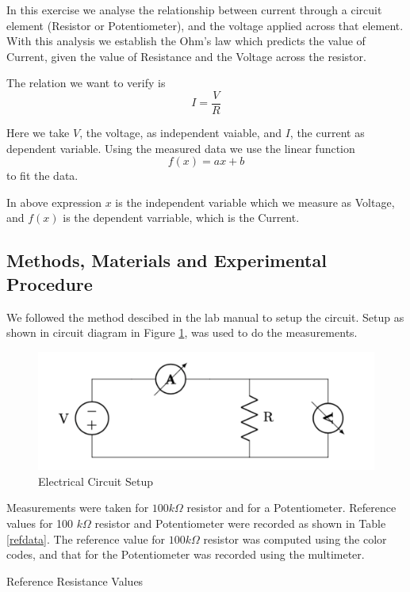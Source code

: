 \documentclass[letterpaper,12pt]{article}
\begin{document}
In this exercise we analyse the relationship between current through a circuit element (Resistor or Potentiometer), and the voltage applied across that element. 
With this analysis we establish the Ohm's law which predicts the value of Current, given the value of Resistance and the 
Voltage across the resistor.

The relation we want to verify is $$I = \frac{V}{R}$$

Here we take $V$, the voltage, as independent vaiable, and $I$, the current as dependent variable. Using the measured data
we use the linear function $$f(x) = ax + b$$ to fit the data. 

In above expression $x$ is the independent variable which we measure as Voltage, and $f(x)$ is the dependent varriable, which is 
the Current.

\subsection{Methods, Materials and Experimental Procedure}

We followed the method descibed in the lab manual\cite{lab-manual-ex1} to setup the circuit. Setup as shown in circuit
diagram in Figure \ref{setup}, was used to do the measurements.

\begin{figure}[H]
  \centering
  \includegraphics[width=0.9\linewidth]{../Exercise1/lab_1_ex_1_setup.png}    
  \caption{Electrical Circuit Setup}
  \label{setup}
\end{figure}

Measurements were taken for $100 k\Omega$ resistor and for a Potentiometer. Reference values
for 100 $k\Omega$ resistor and Potentiometer were recorded as shown in Table \ref{refdata}. The reference value
for $100 k\Omega$ resistor was computed using the color codes, and that for the Potentiometer 
was recorded using the multimeter.

\begin{table}[H]
  \centering
  \caption{Reference Resistance Values}
  \label{refdata}
\end{table}
\end{document}
